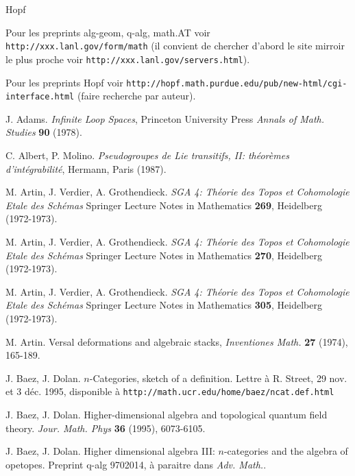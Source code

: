 \documentclass[12pt]{article}
\begin{document}
\begin{thebibliography}{Hopf}

Pour les preprints alg-geom, q-alg, math.AT voir
\newline
{\tt http://xxx.lanl.gov/form/math}
\newline (il convient de chercher d'abord le site
mirroir le plus proche voir \newline
{\tt http://xxx.lanl.gov/servers.html}).

Pour les preprints Hopf voir \newline
{\tt http://hopf.math.purdue.edu/pub/new-html/cgi-interface.html}
\newline
(faire recherche par auteur).

J. Adams. {\em Infinite Loop Spaces}, Princeton University Press {\em Annals
of Math. Studies} {\bf 90} (1978).

C. Albert, P. Molino. {\em Pseudogroupes de Lie transitifs, II:
th\'eor\`emes d'int\'egrabilit\'e}, Hermann, Paris (1987).

M. Artin, J. Verdier, A. Grothendieck. {\em SGA 4: Th\'eorie des Topos et
Cohomologie Etale des Sch\'emas} Springer Lecture Notes in Mathematics {\bf
269},  Heidelberg (1972-1973).

M. Artin, J. Verdier, A. Grothendieck. {\em SGA 4: Th\'eorie des Topos et
Cohomologie Etale des Sch\'emas} Springer Lecture Notes in Mathematics
{\bf 270},  Heidelberg (1972-1973).

M. Artin, J. Verdier, A. Grothendieck. {\em SGA 4: Th\'eorie des Topos et
Cohomologie Etale des Sch\'emas} Springer Lecture Notes in Mathematics {\bf
305}, Heidelberg
(1972-1973).


M. Artin.  Versal deformations and algebraic stacks, {\em Inventiones Math.}
{\bf 27} (1974), 165-189.

J. Baez, J. Dolan. $n$-Categories, sketch of a
definition. Lettre \`a R. Street, 29 nov. et 3 d\'ec. 1995, disponible \`a
{\tt http://math.ucr.edu/home/baez/ncat.def.html}

J. Baez, J. Dolan. Higher-dimensional algebra and
topological quantum field theory. {\em  Jour. Math. Phys} {\bf  36} (1995),
6073-6105.

J. Baez, J. Dolan. Higher dimensional algebra III: $n$-categories and the
algebra of opetopes.
Preprint
q-alg 9702014, \`a paraitre dans {\em Adv. Math.}.


\end{thebibliography}
\end{document}
